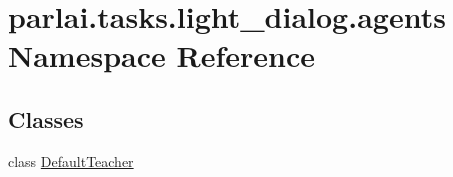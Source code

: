 \hypertarget{namespaceparlai_1_1tasks_1_1light__dialog_1_1agents}{}\section{parlai.\+tasks.\+light\+\_\+dialog.\+agents Namespace Reference}
\label{namespaceparlai_1_1tasks_1_1light__dialog_1_1agents}
\subsection*{Classes}
\begin{DoxyCompactItemize}
\item 
class \hyperlink{classparlai_1_1tasks_1_1light__dialog_1_1agents_1_1DefaultTeacher}{Default\+Teacher}
\end{DoxyCompactItemize}
